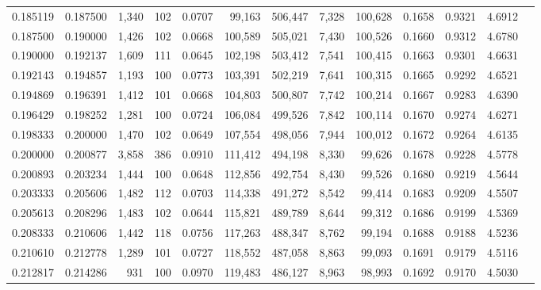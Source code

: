 \begin{tabular}{rrrrrrrrrrrrr}
0.185119 & 0.187500 &  1,340 &   102 &                                     0.0707 &  99,163 & 506,447 &   7,328 & 100,628 & 0.1658 & 0.9321 & 4.6912 \\
0.187500 & 0.190000 &  1,426 &   102 &                                     0.0668 & 100,589 & 505,021 &   7,430 & 100,526 & 0.1660 & 0.9312 & 4.6780 \\
0.190000 & 0.192137 &  1,609 &   111 &                                     0.0645 & 102,198 & 503,412 &   7,541 & 100,415 & 0.1663 & 0.9301 & 4.6631 \\
0.192143 & 0.194857 &  1,193 &   100 &                                     0.0773 & 103,391 & 502,219 &   7,641 & 100,315 & 0.1665 & 0.9292 & 4.6521 \\
0.194869 & 0.196391 &  1,412 &   101 &                                     0.0668 & 104,803 & 500,807 &   7,742 & 100,214 & 0.1667 & 0.9283 & 4.6390 \\
0.196429 & 0.198252 &  1,281 &   100 &                                     0.0724 & 106,084 & 499,526 &   7,842 & 100,114 & 0.1670 & 0.9274 & 4.6271 \\
0.198333 & 0.200000 &  1,470 &   102 &                                     0.0649 & 107,554 & 498,056 &   7,944 & 100,012 & 0.1672 & 0.9264 & 4.6135 \\
0.200000 & 0.200877 &  3,858 &   386 &                                     0.0910 & 111,412 & 494,198 &   8,330 &  99,626 & 0.1678 & 0.9228 & 4.5778 \\
0.200893 & 0.203234 &  1,444 &   100 &                                     0.0648 & 112,856 & 492,754 &   8,430 &  99,526 & 0.1680 & 0.9219 & 4.5644 \\
0.203333 & 0.205606 &  1,482 &   112 &                                     0.0703 & 114,338 & 491,272 &   8,542 &  99,414 & 0.1683 & 0.9209 & 4.5507 \\
0.205613 & 0.208296 &  1,483 &   102 &                                     0.0644 & 115,821 & 489,789 &   8,644 &  99,312 & 0.1686 & 0.9199 & 4.5369 \\
0.208333 & 0.210606 &  1,442 &   118 &                                     0.0756 & 117,263 & 488,347 &   8,762 &  99,194 & 0.1688 & 0.9188 & 4.5236 \\
0.210610 & 0.212778 &  1,289 &   101 &                                     0.0727 & 118,552 & 487,058 &   8,863 &  99,093 & 0.1691 & 0.9179 & 4.5116 \\
0.212817 & 0.214286 &    931 &   100 &                                     0.0970 & 119,483 & 486,127 &   8,963 &  98,993 & 0.1692 & 0.9170 & 4.5030 \\

\end{tabular}
